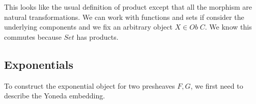 \documentclass{article}
\begin{document}
\begin{figure}[!h]
    \centering
\end{figure}

This looks like the usual definition of product except that all the morphism are natural transformations. We can work with functions and sets if consider the underlying components and we fix an arbitrary object $X \in Ob \;C$. We know this commutes because $Set$ has products.


\begin{figure}[!h]
    \centering
\end{figure}

\subsection{Exponentials}
To construct the exponential object for two presheaves $F,G$, we first need to describe the Yoneda embedding.
\end{document}
